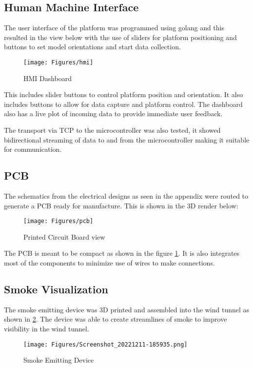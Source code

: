 \subsection{Human Machine Interface}
The user interface of the platform was programmed using golang and this resulted in the view below with the use of sliders for platform positioning and buttons to set model orientations and start data collection.
\begin{center}
	\begin{figure}[H]
		\centering
		\texttt{[image: Figures/hmi]}
		\caption[HMI Dashboard]{HMI Dashboard}
	\end{figure}
\end{center}

This includes slider buttons to control platform position and orientation. It also includes buttons to allow for data capture  and platform control. The dashboard also has a live plot of incoming data to provide immediate user feedback.

The transport via TCP to the microcontroller was also tested, it showed bidirectional streaming of data to and from the microcontroller making it suitable for communication.

\subsection{PCB}
The schematics from the electrical designs as seen in the appendix were routed to generate a PCB ready for manufacture. This is shown in the 3D render below:
\begin{center}
	\begin{figure}[H]
		\centering
		\texttt{[image: Figures/pcb]}
		\caption[Printed Circuit Board view]{Printed Circuit Board view}
		\label{fig:pcb3d}
	\end{figure}
\end{center}
The PCB is meant to be compact as shown in the figure \ref{fig:pcb3d}. It is also integrates most of the components to minimize use of wires to make connections.

\subsection{Smoke Visualization}
The smoke emitting device was 3D printed and assembled into the wind tunnel as shown in \ref{fig:smoke_res}.
The device was able to create streamlines of smoke to improve visibility in the wind tunnel.
\begin{center}
	\begin{figure}
		\centering
		\texttt{[image: Figures/Screenshot\_20221211-185935.png]}
		\caption[Smoke Emitting Device]{Smoke Emitting Device}
		\label{fig:smoke_res}
	\end{figure}
\end{center}
